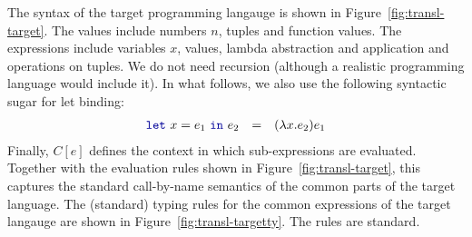The syntax of the target programming langauge is shown in Figure~\ref{fig:transl-target}. 
The values include numbers $n$, tuples and function values.
The expressions include variables $x$, values, lambda abstraction and application and operations 
on tuples. We do not need recursion (although a realistic programming language would include it). 
In what follows, we also use the following syntactic sugar for let binding:
%
\begin{equation*}
\begin{array}{rcl}
  \kvd{let}~x=e_1~\kvd{in}~e_2 &=& (\lambda x.e_2) e_1
\end{array}
\end{equation*}
%
Finally, $C[e]$ defines the context in which sub-expressions are evaluated. Together with the
evaluation rules shown in  Figure~\ref{fig:transl-target}, this captures the standard call-by-name
semantics of the common parts of the target language.
The (standard) typing rules for the common expressions of the target langauge are shown in 
Figure~\ref{fig:transl-targetty}. The rules are standard. 


